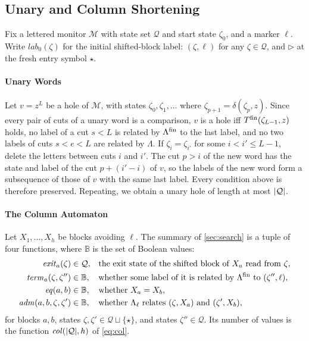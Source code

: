 \subsection{Unary and Column Shortening}
Fix a lettered monitor $\mathcal M$ with state set $\mathcal Q$ and
start state $\zeta_0$, and a marker $\ell$. Write
$\mathit{lab}_0(\zeta)$ for the initial shifted-block label:
$(\zeta,\ell)$ for any $\zeta\in\mathcal Q$, and
$\triangleright$ at the fresh entry symbol $\star$.

\paragraph{Unary Words}
Let $v = z^L$ be a hole of $\mathcal{M}$, with states $\zeta_0, \zeta_1, \dots$ where
$\zeta_{p+1} = \delta(\zeta_p,z)$. Since every pair of cuts of a unary word is a comparison, $v$ is a
hole iff $T^{\mathrm{fin}}(\zeta_{L-1},z)$ holds, no label of a cut $s < L$ is related by $\Lambda^{\mathrm{fin}}$ to the
last label, and no two labels of cuts $s < e < L$ are related by $\Lambda$. If
$\zeta_i = \zeta_{i'}$ for some $i < i' \le L-1$, delete the letters between cuts $i$ and $i'$.
The cut $p > i$ of the new word has the state and label of the cut $p + (i'-i)$ of $v$, so the
labels of the new word form a subsequence of those of $v$ with the same last label. Every
condition above is therefore preserved. Repeating, we obtain a unary hole of length at most
$\lvert \mathcal Q\rvert$.

\paragraph{The Column Automaton}
Let $X_1,\dots,X_h$ be blocks avoiding $\ell$. The summary of \cref{sec:search} is a tuple of
four functions, where $\mathbb{B}$ is the set of Boolean values:
\begin{align*}
  \mathit{exit}_a(\zeta) &\in \mathcal Q, &&\text{the exit state of the shifted block of } X_a
                                 \text{ read from } \zeta,\\
  \mathit{term}_a(\zeta,\zeta'') &\in \mathbb{B}, &&\text{whether some label of it is related by }
                                 \Lambda^{\mathrm{fin}} \text{ to } (\zeta'',\ell),\\
  \mathit{eq}(a,b) &\in \mathbb{B}, &&\text{whether } X_a = X_b,\\
  \mathit{adm}(a,b,\zeta,\zeta') &\in \mathbb{B}, &&\text{whether } \Lambda_\ell \text{ relates }
                                 (\zeta,X_a) \text{ and } (\zeta',X_b),
\end{align*}
for blocks $a,b$, states $\zeta,\zeta' \in \mathcal Q \sqcup \{\star\}$, and states $\zeta'' \in \mathcal Q$. Its number
of values is the function $\mathit{col}(\lvert \mathcal Q\rvert,h)$ of \eqref{eq:col}.

